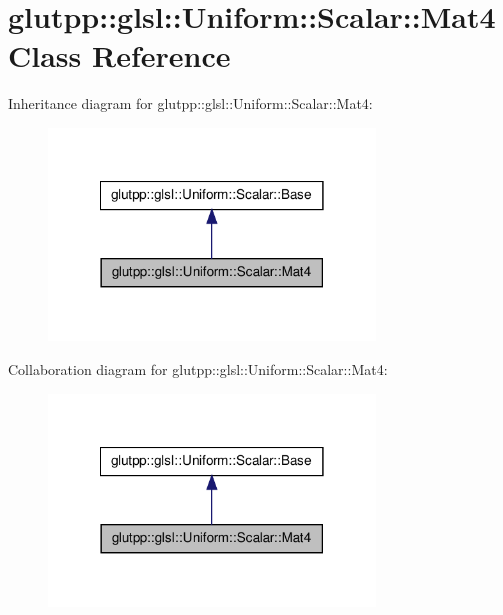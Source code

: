 \hypertarget{classglutpp_1_1glsl_1_1Uniform_1_1Scalar_1_1Mat4}{\section{glutpp\-:\-:glsl\-:\-:\-Uniform\-:\-:\-Scalar\-:\-:\-Mat4 \-Class \-Reference}
\label{classglutpp_1_1glsl_1_1Uniform_1_1Scalar_1_1Mat4}
}


\-Inheritance diagram for glutpp\-:\-:glsl\-:\-:\-Uniform\-:\-:\-Scalar\-:\-:\-Mat4\-:
\nopagebreak
\begin{figure}[H]
\begin{center}
\leavevmode
\includegraphics[width=246pt]{classglutpp_1_1glsl_1_1Uniform_1_1Scalar_1_1Mat4__inherit__graph}
\end{center}
\end{figure}


\-Collaboration diagram for glutpp\-:\-:glsl\-:\-:\-Uniform\-:\-:\-Scalar\-:\-:\-Mat4\-:
\nopagebreak
\begin{figure}[H]
\begin{center}
\leavevmode
\includegraphics[width=246pt]{classglutpp_1_1glsl_1_1Uniform_1_1Scalar_1_1Mat4__coll__graph}
\end{center}
\end{figure}
